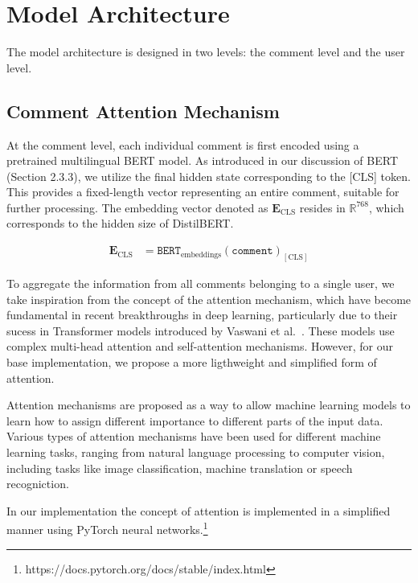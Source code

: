 \documentclass[twoside]{ctuthesis}
\theoremstyle{plain}
\theoremstyle{definition}
\theoremstyle{note}
\begin{document}
\section{Model Architecture}
The model architecture is designed in two levels: the comment level and the user level. 

\subsection{Comment Attention Mechanism}

At the comment level, each individual comment is first encoded using a pretrained multilingual BERT model. As introduced in our discussion of BERT (Section 2.3.3), we utilize the final hidden state corresponding to the [CLS] token. This provides a fixed-length vector representing an entire comment, suitable for further processing. The embedding vector denoted as \( \mathbf{E}_{\mathrm{CLS}} \) resides in \( \mathbb{R}^{768} \), which corresponds to the hidden size of DistilBERT.

\begin{align}
 \mathbf{E}_{\mathrm{CLS}} &= \texttt{BERT}_{\mathrm{embeddings}}(\texttt{comment})_{[\mathrm{CLS}]}
\end{align}

To aggregate the information from all comments belonging to a single user, we take inspiration from the concept of the attention mechanism, which have become fundamental in recent breakthroughs in deep learning, particularly due to their sucess in Transformer models introduced by Vaswani et al.~\cite{Vaswani2017}. These models use complex multi-head attention and self-attention mechanisms. However, for our base implementation, we propose a more ligthweight and simplified form of attention.\par

Attention mechanisms are proposed as a way to allow machine learning models to learn how to assign different importance to different parts of the input data. Various types of attention mechanisms have been used for different machine learning tasks, ranging from natural language processing to computer vision, including tasks like image classification, machine translation or speech recogniction.\cite{Niu2021}

In our implementation the concept of attention is implemented in a simplified manner using PyTorch neural networks.\footnote{https://docs.pytorch.org/docs/stable/index.html}\par
\end{document}
